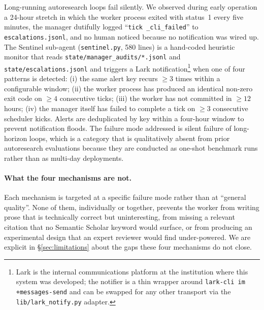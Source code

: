 Long-running autoresearch loops fail silently. We observed during early
operation a 24-hour stretch in which the worker process exited with
status~1 every five minutes, the manager dutifully logged ``\texttt{tick
\_cli\_failed}'' to \texttt{escalations.jsonl}, and no human noticed
because no notification was wired up. The Sentinel sub-agent
(\texttt{sentinel.py}, 580 lines) is a hand-coded heuristic monitor
that reads \texttt{state/manager\_audits/*.jsonl} and
\texttt{state/escalations.jsonl} and triggers a Lark
notification\footnote{Lark is the internal communications platform at
the institution where this system was developed; the notifier is a
thin wrapper around \texttt{lark-cli im +messages-send} and can be
swapped for any other transport via the \texttt{lib/lark\_notify.py}
adapter.} when one of four patterns is detected:
(i) the same alert key recurs $\geq 3$ times within a configurable
window; (ii) the worker process has produced an identical non-zero exit
code on $\geq 4$ consecutive ticks; (iii) the worker has not committed
in $\geq 12$ hours; (iv) the manager itself has failed to complete a
tick on $\geq 3$ consecutive scheduler kicks. Alerts are deduplicated by
key within a four-hour window to prevent notification floods. The
failure mode addressed is silent failure of long-horizon loops, which is
a category that is qualitatively absent from prior autoresearch
evaluations because they are conducted as one-shot benchmark runs
rather than as multi-day deployments.

\paragraph{What the four mechanisms are not.}
Each mechanism is targeted at a specific failure mode rather than at
``general quality''. None of them, individually or together, prevents
the worker from writing prose that is technically correct but
uninteresting, from missing a relevant citation that no Semantic Scholar
keyword would surface, or from producing an experimental design that an
expert reviewer would find under-powered. We are explicit in
\S\ref{sec:limitations} about the gaps these four mechanisms do not
close.
